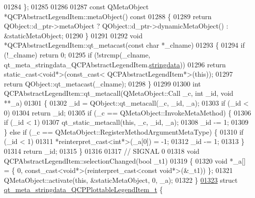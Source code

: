 \begin{DoxyCode}
01284 \};
01285 
01286 
01287 \textcolor{keyword}{const} QMetaObject *QCPAbstractLegendItem::metaObject()\textcolor{keyword}{ const}
01288 \textcolor{keyword}{}\{
01289     \textcolor{keywordflow}{return} QObject::d\_ptr->metaObject ? QObject::d\_ptr->dynamicMetaObject() : &staticMetaObject;
01290 \}
01291 
01292 \textcolor{keywordtype}{void} *QCPAbstractLegendItem::qt\_metacast(\textcolor{keyword}{const} \textcolor{keywordtype}{char} *\_clname)
01293 \{
01294     \textcolor{keywordflow}{if} (!\_clname) \textcolor{keywordflow}{return} 0;
01295     \textcolor{keywordflow}{if} (!strcmp(\_clname, qt\_meta\_stringdata\_QCPAbstractLegendItem.\hyperlink{a00016_a007f69edf60f3475c27481b80fb00e7f}{stringdata}))
01296         \textcolor{keywordflow}{return} \textcolor{keyword}{static\_cast<}\textcolor{keywordtype}{void}*\textcolor{keyword}{>}(\textcolor{keyword}{const\_cast<} QCPAbstractLegendItem*\textcolor{keyword}{>}(\textcolor{keyword}{this}));
01297     \textcolor{keywordflow}{return} QObject::qt\_metacast(\_clname);
01298 \}
01299 
01300 \textcolor{keywordtype}{int} QCPAbstractLegendItem::qt\_metacall(QMetaObject::Call \_c, \textcolor{keywordtype}{int} \_id, \textcolor{keywordtype}{void} **\_a)
01301 \{
01302     \_id = QObject::qt\_metacall(\_c, \_id, \_a);
01303     \textcolor{keywordflow}{if} (\_id < 0)
01304         \textcolor{keywordflow}{return} \_id;
01305     \textcolor{keywordflow}{if} (\_c == QMetaObject::InvokeMetaMethod) \{
01306         \textcolor{keywordflow}{if} (\_id < 1)
01307             qt\_static\_metacall(\textcolor{keyword}{this}, \_c, \_id, \_a);
01308         \_id -= 1;
01309     \} \textcolor{keywordflow}{else} \textcolor{keywordflow}{if} (\_c == QMetaObject::RegisterMethodArgumentMetaType) \{
01310         \textcolor{keywordflow}{if} (\_id < 1)
01311             *\textcolor{keyword}{reinterpret\_cast<}\textcolor{keywordtype}{int}*\textcolor{keyword}{>}(\_a[0]) = -1;
01312         \_id -= 1;
01313     \}
01314     \textcolor{keywordflow}{return} \_id;
01315 \}
01316 
01317 \textcolor{comment}{// SIGNAL 0}
01318 \textcolor{keywordtype}{void} QCPAbstractLegendItem::selectionChanged(\textcolor{keywordtype}{bool} \_t1)
01319 \{
01320     \textcolor{keywordtype}{void} *\_a[] = \{ 0, \textcolor{keyword}{const\_cast<}\textcolor{keywordtype}{void}*\textcolor{keyword}{>}(\textcolor{keyword}{reinterpret\_cast<}\textcolor{keyword}{const }\textcolor{keywordtype}{void}*\textcolor{keyword}{>}(&\_t1)) \};
01321     QMetaObject::activate(\textcolor{keyword}{this}, &staticMetaObject, 0, \_a);
01322 \}
\hypertarget{a00016_source_l01323}{}\hyperlink{a00016}{01323} \textcolor{keyword}{struct }\hyperlink{a00016_d4/d3e/a00116}{qt\_meta\_stringdata\_QCPPlottableLegendItem\_t} \{

\end{DoxyCode}
